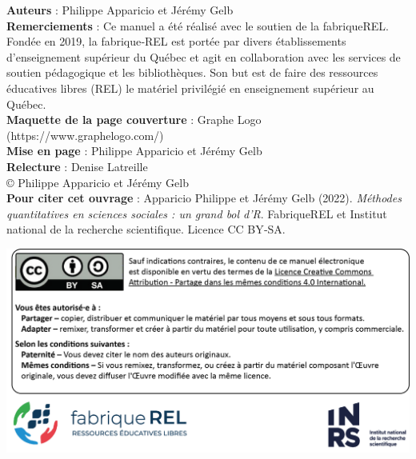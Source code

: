 

\textbf{Auteurs} : Philippe Apparicio et Jérémy Gelb\\[0.05in]
\textbf{Remerciements} : Ce manuel a été réalisé avec le soutien de la fabriqueREL. Fondée en 2019, la fabrique‑REL est portée par divers établissements d’enseignement supérieur du Québec et agit en collaboration avec les services de soutien pédagogique et les bibliothèques. Son but est de faire des ressources éducatives libres (REL) le matériel privilégié en enseignement supérieur au Québec.\\[0.05in]
\textbf{Maquette de la page couverture} : Graphe Logo (https://www.graphelogo.com/)\\[0.05in]
\textbf{Mise en page} : Philippe Apparicio et Jérémy Gelb\\[0.05in]
\textbf{Relecture} : Denise Latreille\\[0.2in]

© Philippe Apparicio et Jérémy Gelb\\[0.2in]

\textbf{Pour citer cet ouvrage} : Apparicio Philippe et Jérémy Gelb (2022). \textit{Méthodes quantitatives en sciences sociales : un grand bol d’R}. FabriqueREL et Institut national de la recherche scientifique. Licence CC BY‑SA.\\[1in]

\begin{center}
\includegraphics{images/introduction/CouvertureP2.png}
\end{center}

